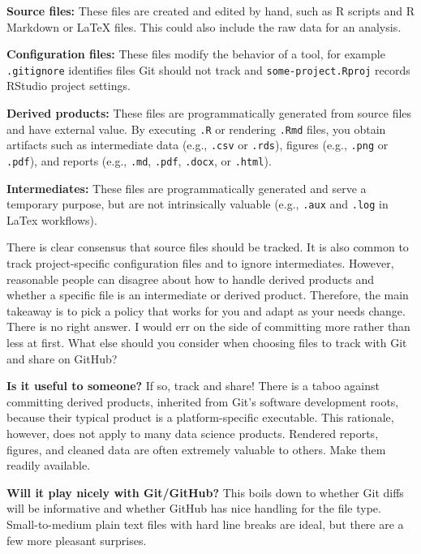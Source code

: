 \documentclass[12pt]{article}
\begin{document}
\textbf{Source files:} These files are created and edited by hand, such
as R scripts and R Markdown or LaTeX files. This could also include the
raw data for an analysis.

\textbf{Configuration files:} These files modify the behavior of a tool,
for example \texttt{.gitignore} identifies files Git should not track
and \texttt{some-project.Rproj} records RStudio project settings.

\textbf{Derived products:} These files are programmatically generated
from source files and have external value. By executing \texttt{.R} or
rendering \texttt{.Rmd} files, you obtain artifacts such as intermediate
data (e.g., \texttt{.csv} or \texttt{.rds}), figures (e.g.,
\texttt{.png} or \texttt{.pdf}), and reports (e.g., \texttt{.md},
\texttt{.pdf}, \texttt{.docx}, or \texttt{.html}).

\textbf{Intermediates:} These files are programmatically generated and
serve a temporary purpose, but are not intrinsically valuable (e.g.,
\texttt{.aux} and \texttt{.log} in LaTex workflows).

There is clear consensus that source files should be tracked. It is also
common to track project-specific configuration files and to ignore
intermediates. However, reasonable people can disagree about how to
handle derived products and whether a specific file is an intermediate
or derived product. Therefore, the main takeaway is to pick a policy
that works for you and adapt as your needs change. There is no right
answer. I would err on the side of committing more rather than less at
first. What else should you consider when choosing files to track with
Git and share on GitHub?

\textbf{Is it useful to someone?} If so, track and share! There is a
taboo against committing derived products, inherited from Git's software
development roots, because their typical product is a platform-specific
executable. This rationale, however, does not apply to many data science
products. Rendered reports, figures, and cleaned data are often
extremely valuable to others. Make them readily available.

\textbf{Will it play nicely with Git/GitHub?} This boils down to whether
Git diffs will be informative and whether GitHub has nice handling for
the file type. Small-to-medium plain text files with hard line breaks
are ideal, but there are a few more pleasant surprises.
\end{document}

